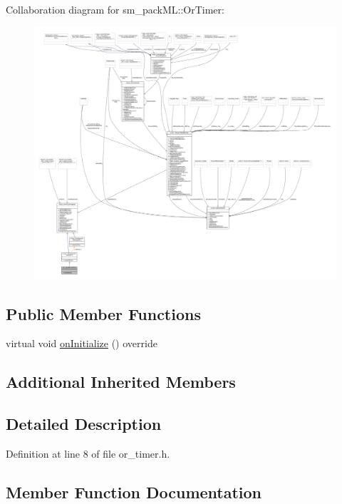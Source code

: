 Collaboration diagram for sm\+\_\+pack\+ML\+:\+:Or\+Timer\+:
\nopagebreak
\begin{figure}[H]
\begin{center}
\leavevmode
\includegraphics[width=350pt]{classsm__packML_1_1OrTimer__coll__graph}
\end{center}
\end{figure}
\subsection*{Public Member Functions}
\begin{DoxyCompactItemize}
\item 
virtual void \hyperlink{classsm__packML_1_1OrTimer_acd49116ccc2d8c20ef8f2d5fd8384793}{on\+Initialize} () override
\end{DoxyCompactItemize}
\subsection*{Additional Inherited Members}


\subsection{Detailed Description}


Definition at line 8 of file or\+\_\+timer.\+h.



\subsection{Member Function Documentation}
